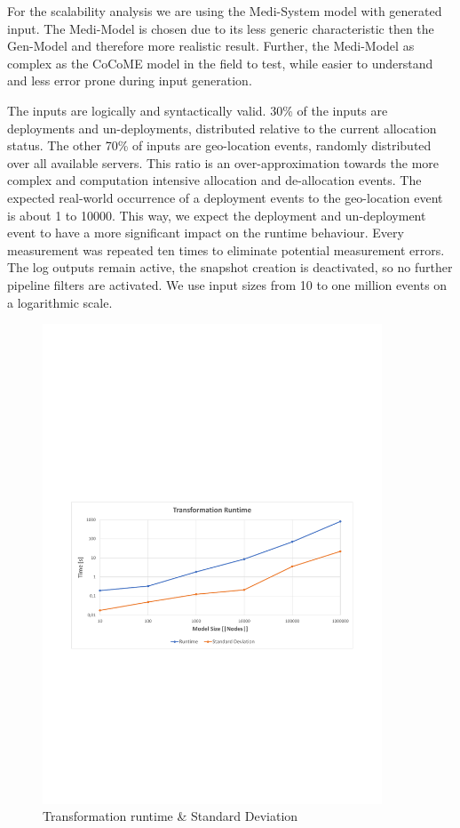 For the scalability analysis we are using the Medi-System model with generated input. The Medi-Model is chosen due to its less generic characteristic then the Gen-Model and therefore more realistic result. Further, the Medi-Model as complex as the CoCoME model in the field to test, while easier to understand and less error prone during input generation.

The inputs are logically and syntactically valid. 30\% of the inputs are deployments and un-deployments, distributed relative to the current allocation status. The other 70\% of inputs are geo-location events, randomly distributed over all available servers. This ratio is an over-approximation towards the more complex and computation intensive allocation and de-allocation events. The expected real-world occurrence of a deployment events to the geo-location event is about 1 to 10000. This way, we expect the deployment and un-deployment event to have a more significant impact on the runtime behaviour. Every measurement was repeated ten times to eliminate potential measurement errors. The log outputs remain active, the snapshot creation is deactivated, so no further pipeline filters are activated. We use input sizes from 10 to one million events on a logarithmic scale.

\begin{figure}[h]
	\centering
	\includegraphics[trim = 10mm 90mm 10mm 110mm, clip, width=0.90\textwidth]{graphs/Runtime_Transformation}
	\caption{Transformation runtime \& Standard Deviation}
	\label{fig:eval:trans:runtime}
\end{figure}

